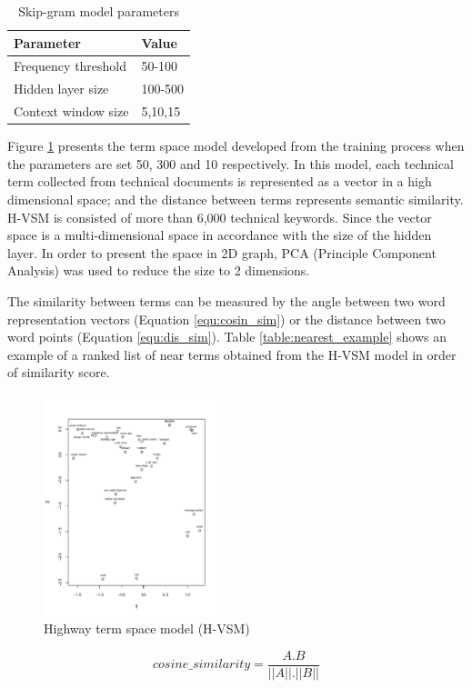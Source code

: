 \documentclass[Journal, InsideFigs, DoubleSpace]{ascelike} %
\begin{document}
%
\begin{table} [t]
	\caption{Skip-gram model parameters}
	\label{table:nn-parameters}
	\centering
	\small
	\renewcommand{\arraystretch}{1.25}
	\begin{tabular}{l l}
		\hline
		\textbf{Parameter} & \textbf{Value}\\
		\hline
		Frequency threshold & 50-100\\
		Hidden layer size		&	100-500\\
		Context window size	&	5,10,15\\
		\hline
	\end{tabular}
	\normalsize
\end{table}
%
\par
Figure \ref{fig:hvsm} presents the term space model developed from the training process when the parameters are set 50, 300 and 10 respectively. In this model, each technical term collected from technical documents is represented as a vector in a high dimensional space; and the distance between terms represents semantic similarity. H-VSM is consisted of more than 6,000 technical keywords. Since the vector space is a multi-dimensional space in accordance with the size of the hidden layer. In order to present the space in 2D graph, PCA (Principle Component Analysis) was used to reduce the size to 2 dimensions. 
\par
The similarity between terms can be measured by the angle between two word representation vectors (Equation \ref{equ:cosin_sim}) or the distance between two word points (Equation \ref{equ:dis_sim}). Table \ref{table:nearest_example} shows an example of a ranked list of near terms obtained from the H-VSM model in order of similarity score.
%
\begin{figure}[t]
	\centering
	\includegraphics[width=0.45\textwidth]{Figure5_hvsm_space}
	\caption{Highway term space model (H-VSM)}
	\label{fig:hvsm}
\end{figure}
%
\begin{equation}
\label{equ:cosin_sim}
cosine\_similarity = \frac{A.B}{||A||.||B||}
\end{equation}
\end{document}
